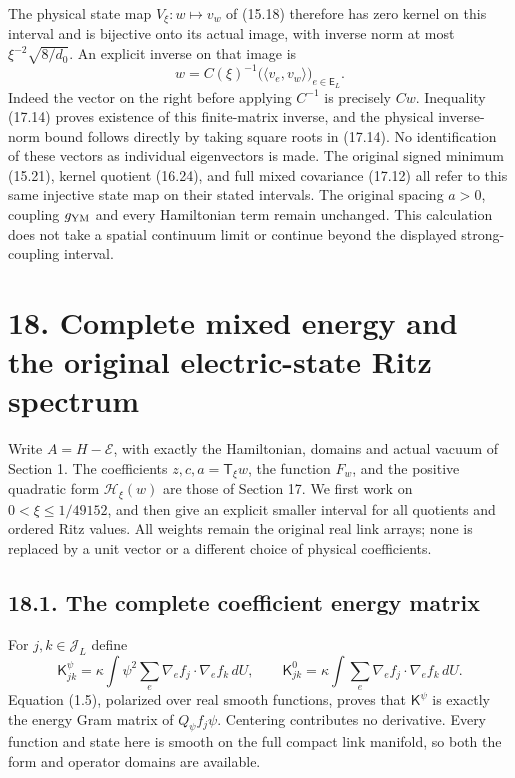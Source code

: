 \documentclass[
]{article}
\begin{document}
The physical state map \(V_\xi:w\mapsto v_w\) of (15.18) therefore has
zero kernel on this interval and is bijective onto its actual image,
with inverse norm at most \(\xi^{-2}\sqrt{8/d_0}\). An explicit inverse
on that image is \[
w=C(\xi)^{-1}
      \bigl(\langle v_e,v_w\rangle\bigr)_{e\in\mathsf E_L}.
                                                               \tag{17.15}
\] Indeed the vector on the right before applying \(C^{-1}\) is
precisely \(Cw\). Inequality (17.14) proves existence of this
finite-matrix inverse, and the physical inverse-norm bound follows
directly by taking square roots in (17.14). No identification of these
vectors as individual eigenvectors is made. The original signed minimum
(15.21), kernel quotient (16.24), and full mixed covariance (17.12) all
refer to this same injective state map on their stated intervals. The
original spacing \(a>0\), coupling \(g_{\rm YM}\) and every Hamiltonian
term remain unchanged. This calculation does not take a spatial
continuum limit or continue beyond the displayed strong-coupling
interval.

\section{18. Complete mixed energy and the original electric-state Ritz
spectrum}\label{complete-mixed-energy-and-the-original-electric-state-ritz-spectrum}

Write \(A=H-\mathcal E\), with exactly the Hamiltonian, domains and
actual vacuum of Section 1. The coefficients \(z,c,a=\mathsf T_\xi w\),
the function \(F_w\), and the positive quadratic form
\(\mathcal H_\xi(w)\) are those of Section 17. We first work on
\(0<\xi\le1/49152\), and then give an explicit smaller interval for all
quotients and ordered Ritz values. All weights remain the original real
link arrays; none is replaced by a unit vector or a different choice of
physical coefficients.

\subsection{18.1. The complete coefficient energy
matrix}\label{the-complete-coefficient-energy-matrix}

For \(j,k\in\mathscr J_L\) define \[
\mathsf K^\psi_{jk}
 =\kappa\int\psi^2\sum_e\nabla_e f_j\cdot\nabla_e f_k\,dU,
\qquad
\mathsf K^0_{jk}
 =\kappa\int\sum_e\nabla_e f_j\cdot\nabla_e f_k\,dU .       \tag{18.1}
\] Equation (1.5), polarized over real smooth functions, proves that
\(\mathsf K^\psi\) is exactly the energy Gram matrix of
\(Q_\psi f_j\psi\). Centering contributes no derivative. Every function
and state here is smooth on the full compact link manifold, so both the
form and operator domains are available.
\end{document}
